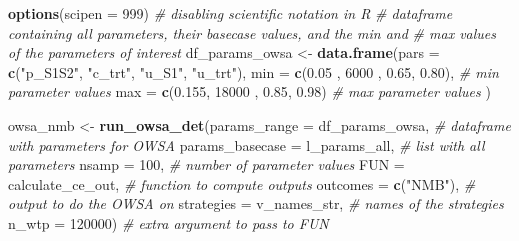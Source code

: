 \documentclass[
]{article}
\newenvironment{Shaded}{\begin{snugshade}}{\end{snugshade}}
\newcommand{\CommentTok}[1]{\textcolor[rgb]{0.56,0.35,0.01}{\textit{#1}}}
\newcommand{\DataTypeTok}[1]{\textcolor[rgb]{0.13,0.29,0.53}{#1}}
\newcommand{\DecValTok}[1]{\textcolor[rgb]{0.00,0.00,0.81}{#1}}
\newcommand{\FloatTok}[1]{\textcolor[rgb]{0.00,0.00,0.81}{#1}}
\newcommand{\KeywordTok}[1]{\textcolor[rgb]{0.13,0.29,0.53}{\textbf{#1}}}
\newcommand{\NormalTok}[1]{#1}
\newcommand{\StringTok}[1]{\textcolor[rgb]{0.31,0.60,0.02}{#1}}
\begin{document}
\begin{Shaded}
\begin{Highlighting}[]
\KeywordTok{options}\NormalTok{(}\DataTypeTok{scipen =} \DecValTok{999}\NormalTok{) }\CommentTok{# disabling scientific notation in R}
\CommentTok{# dataframe containing all parameters, their basecase values, and the min and }
\CommentTok{# max values of the parameters of interest }
\NormalTok{df_params_owsa <-}\StringTok{ }\KeywordTok{data.frame}\NormalTok{(}\DataTypeTok{pars =} \KeywordTok{c}\NormalTok{(}\StringTok{"p_S1S2"}\NormalTok{, }\StringTok{"c_trt"}\NormalTok{, }\StringTok{"u_S1"}\NormalTok{, }\StringTok{"u_trt"}\NormalTok{),}
                             \DataTypeTok{min  =} \KeywordTok{c}\NormalTok{(}\FloatTok{0.05}\NormalTok{ ,  }\DecValTok{6000}\NormalTok{ , }\FloatTok{0.65}\NormalTok{, }\FloatTok{0.80}\NormalTok{),  }\CommentTok{# min parameter values}
                             \DataTypeTok{max  =} \KeywordTok{c}\NormalTok{(}\FloatTok{0.155}\NormalTok{, }\DecValTok{18000}\NormalTok{ , }\FloatTok{0.85}\NormalTok{, }\FloatTok{0.98}\NormalTok{)   }\CommentTok{# max parameter values}
\NormalTok{                             )}

\NormalTok{owsa_nmb  <-}\StringTok{ }\KeywordTok{run_owsa_det}\NormalTok{(}\DataTypeTok{params_range     =}\NormalTok{ df_params_owsa,    }\CommentTok{# dataframe with parameters for OWSA}
                          \DataTypeTok{params_basecase  =}\NormalTok{ l_params_all,      }\CommentTok{# list with all parameters}
                          \DataTypeTok{nsamp            =} \DecValTok{100}\NormalTok{,               }\CommentTok{# number of parameter values}
                          \DataTypeTok{FUN              =}\NormalTok{ calculate_ce_out,  }\CommentTok{# function to compute outputs}
                          \DataTypeTok{outcomes         =} \KeywordTok{c}\NormalTok{(}\StringTok{"NMB"}\NormalTok{),          }\CommentTok{# output to do the OWSA on}
                          \DataTypeTok{strategies       =}\NormalTok{ v_names_str,       }\CommentTok{# names of the strategies}
                          \DataTypeTok{n_wtp            =} \DecValTok{120000}\NormalTok{)            }\CommentTok{# extra argument to pass to FUN}
\end{Highlighting}
\end{Shaded}
\end{document}
